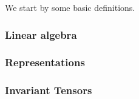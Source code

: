 We start by some basic definitions.


\subsubsection{Linear algebra}

    


\subsubsection{Representations}
    


\subsubsection{Invariant Tensors}
    
